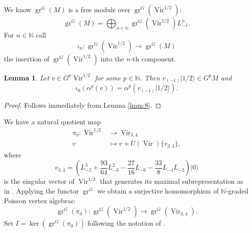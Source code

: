\documentclass[12pt,a4paper]{article}
\newtheorem{lemma}{Lemma}
\DeclareMathOperator{\Vir}{Vir}
\DeclareMathOperator{\gr}{gr}
\newcommand{\vac}{|0\rangle}
\newcommand{\vachalf}{|1/2\rangle}
\begin{document}
We know $\gr^G(M)$ is a free module over $\gr^G(\Vir^{1/2})$:
\begin{equation*}
  \gr^G(M)=\bigoplus_{n\in \mathbb{N}}\gr^G(\Vir^{1/2})L_{-1}^n.
\end{equation*}
For $n\in \mathbb{N}$ call
\begin{equation*}
  \iota_n:\gr^G(\Vir^{1/2})\to\gr^G(M)
\end{equation*}
the insertion of $\gr^G(\Vir^{1/2})$ into the $n$-th component.
\begin{lemma}
  \label{lmm:9}
  Let $v\in G^p\Vir^{1/2}$ for some $p\in \mathbb{N}$.
  Then $v_{(-1)}\vachalf\in G^pM$ and
  \begin{equation*}
    \iota_0(\alpha^p(v))=\alpha^p(v_{(-1)}\vachalf).
  \end{equation*}
\end{lemma}

\begin{proof}
  Follows immediately from Lemma \ref{lmm:8}.
\end{proof}

We have a natural quotient map
\begin{align*}
  \pi_0:\Vir^{1/2}&\to\Vir_{3,4} \\
 v&\mapsto v+U(\Vir)\{v_{3,4}\},
\end{align*}
where
\begin{equation*}
  v_{3,4}=(L_{-2}^3+\frac{93}{64}L_{-3}^2-\frac{27}{16}L_{-6}-\frac{33}{8}L_{-4}L_{-2})\vac
\end{equation*}
is the singular vector of $\Vir^{1/2}$ that generates its maximal subrepresentation as in \cite{andrews_singular_2022}.
Applying the functor $\gr^G$ we obtain a surjective homomorphism of $\mathbb{N}$-graded Poisson vertex algebras:
\begin{equation*}
  \gr^G(\pi_0):\gr^G(\Vir^{1/2})\to \gr^G(\Vir_{3,4}).
\end{equation*}
Set $I=\ker(\gr^G(\pi_0))$ following the notation of \cite{andrews_singular_2022}.
  
\end{document}
